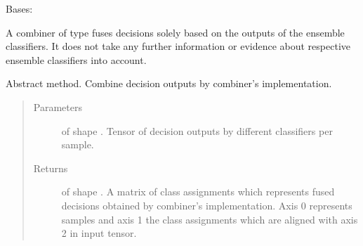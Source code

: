 \documentclass[letterpaper,10pt,english]{sphinxmanual}
\begin{document}
\begin{fulllineitems}
\begin{fulllineitems}
\begin{quote}
\begin{description}
\end{description}\end{quote}

\end{fulllineitems}


\end{fulllineitems}


\begin{fulllineitems}
\label{\detokenize{pusion.core.combiner:pusion.core.combiner.UtilityBasedCombiner}}
\sphinxAtStartPar
Bases: {\hyperref[\detokenize{pusion.core.combiner:pusion.core.combiner.Combiner}]{}}

\sphinxAtStartPar
A combiner of type {\hyperref[\detokenize{pusion.core.combiner:pusion.core.combiner.UtilityBasedCombiner}]{}} fuses decisions solely based on the outputs of the ensemble
classifiers. It does not take any further information or evidence about respective ensemble classifiers into
account.

\begin{fulllineitems}
\label{\detokenize{pusion.core.combiner:pusion.core.combiner.UtilityBasedCombiner.combine}}
\sphinxAtStartPar
Abstract method. Combine decision outputs by combiner’s implementation.
\begin{quote}\begin{description}
\item[{Parameters}] \leavevmode
\sphinxAtStartPar
{} \textendash{}  of shape .
Tensor of decision outputs by different classifiers per sample.

\item[{Returns}] \leavevmode
\sphinxAtStartPar
{} of shape . A matrix of class assignments which represents fused
decisions obtained by combiner’s implementation. Axis 0 represents samples and axis 1 the class
assignments which are aligned with axis 2 in  input tensor.

\end{description}\end{quote}

\end{fulllineitems}


\end{fulllineitems}
\end{document}

